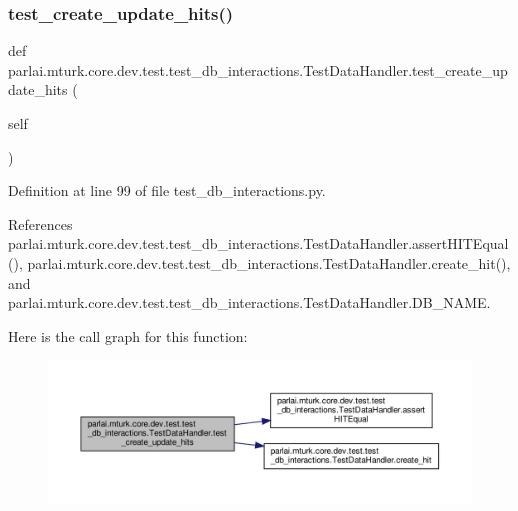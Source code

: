 \subsubsection{\texorpdfstring{test\+\_\+create\+\_\+update\+\_\+hits()}{test\_create\_update\_hits()}}
{\footnotesize\ttfamily def parlai.\+mturk.\+core.\+dev.\+test.\+test\+\_\+db\+\_\+interactions.\+Test\+Data\+Handler.\+test\+\_\+create\+\_\+update\+\_\+hits (\begin{DoxyParamCaption}\item[{}]{self }\end{DoxyParamCaption})}



Definition at line 99 of file test\+\_\+db\+\_\+interactions.\+py.



References parlai.\+mturk.\+core.\+dev.\+test.\+test\+\_\+db\+\_\+interactions.\+Test\+Data\+Handler.\+assert\+H\+I\+T\+Equal(), parlai.\+mturk.\+core.\+dev.\+test.\+test\+\_\+db\+\_\+interactions.\+Test\+Data\+Handler.\+create\+\_\+hit(), and parlai.\+mturk.\+core.\+dev.\+test.\+test\+\_\+db\+\_\+interactions.\+Test\+Data\+Handler.\+D\+B\+\_\+\+N\+A\+ME.

Here is the call graph for this function\+:
\nopagebreak
\begin{figure}[H]
\begin{center}
\leavevmode
\includegraphics[width=350pt]{classparlai_1_1mturk_1_1core_1_1dev_1_1test_1_1test__db__interactions_1_1TestDataHandler_a2c2bbca0d524c9c7997dd2e0e8ef576e_cgraph}
\end{center}
\end{figure}
\mbox{\label{classparlai_1_1mturk_1_1core_1_1dev_1_1test_1_1test__db__interactions_1_1TestDataHandler_a603412b42f5d14e3d2f488d392942f15}} 
